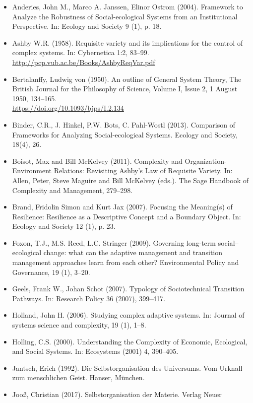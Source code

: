 \documentclass[11pt,a4paper]{article}
\begin{document}
\begin{itemize}
\item Anderies, John M., Marco A. Janssen, Elinor Ostrom (2004).  Framework to
  Analyze the Robustness of Social-ecological Systems from an Institutional
  Perspective. In: Ecology and Society 9 (1), p. 18.
\item Ashby W.R. (1958).  Requisite variety and its implications for the
  control of complex systems. In: Cybernetica 1:2, 83--99.\\
  \url{http://pcp.vub.ac.be/Books/AshbyReqVar.pdf}
\item Bertalanffy, Ludwig von (1950). An outline of General System Theory,
  The British Journal for the Philosophy of Science, Volume I, Issue 2, 1
  August 1950, 134–165.\\ \url{https://doi.org/10.1093/bjps/I.2.134}
\item Binder, C.R., J. Hinkel, P.W. Bots, C. Pahl-Wostl (2013). Comparison of
  Frameworks for Analyzing Social-ecological Systems. Ecology and Society,
  18(4), 26.
\item Boisot, Max and Bill McKelvey (2011). Complexity and
  Organization-Environment Relations: Revisiting Ashby’s Law of Requisite
  Variety. In: Allen, Peter, Steve Maguire and Bill McKelvey (eds.). The
  Sage Handbook of Complexity and Management, 279--298.
\item Brand, Fridolin Simon and Kurt Jax (2007).  Focusing the Meaning(s) of
  Resilience: Resilience as a Descriptive Concept and a Boundary Object. In:
  Ecology and Society 12 (1), p. 23.
\item Foxon, T.J., M.S. Reed, L.C. Stringer (2009). Governing long‐term
  social–ecological change: what can the adaptive management and transition
  management approaches learn from each other? Environmental Policy and
  Governance, 19 (1), 3--20.
\item Geels, Frank W., Johan Schot (2007). Typology of Sociotechnical
  Transition Pathways. In: Research Policy 36 (2007), 399–417.
\item Holland, John H. (2006). Studying complex adaptive systems. In: Journal
  of systems science and complexity, 19 (1), 1–8.
\item Holling, C.S. (2000). Understanding the Complexity of Economic,
  Ecological, and Social Systems. In: Ecosystems (2001) 4, 390–405.
\item Jantsch, Erich (1992). Die Selbstorganisation des Universums. Vom
  Urknall zum menschlichen Geist.  Hanser, München.
\item Jooß, Christian (2017). Selbstorganisation der Materie.  Verlag Neuer

\end{itemize}
\end{document}
